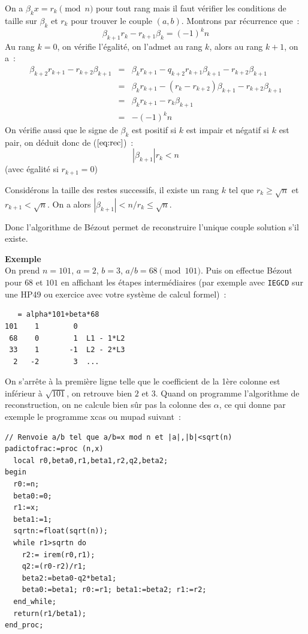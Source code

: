 \documentclass[a4paper,11pt]{book}
\begin{document}
\begin{giacjshere}
On a $ \beta_k x= r_k \pmod n$ pour tout rang mais il faut v\'erifier
les conditions de taille sur $\beta_k$ et $r_k$ pour trouver le couple
$(a,b)$.
Montrons par r\'ecurrence que~:
\begin{equation} \label{eq:rec}
 \beta_{k+1} r_k - r_{k+1} \beta_k = (-1)^k n 
\end{equation}
Au rang $k=0$, on v\'erifie l'\'egalit\'e, on l'admet au rang $k$, 
alors au rang $k+1$, on a~:
\begin{eqnarray*}
 \beta_{k+2} r_{k+1} - r_{k+2} \beta_{k+1} 
& = & \beta_k r_{k+1} - q_{k+2} r_{k+1} \beta_{k+1}  - r_{k+2} \beta_{k+1} \\
& = & \beta_k r_{k+1} - (r_{k}-r_{k+2}) \beta_{k+1}  - r_{k+2} \beta_{k+1} \\
& = & \beta_k r_{k+1} - r_{k} \beta_{k+1} \\
& = & - (-1)^k n
\end{eqnarray*}
On v\'erifie aussi que le signe de $\beta_k$ est positif si $k$ est impair
et n\'egatif si $k$ est pair, on d\'eduit donc de (\(\ref{eq:rec}\))~:
\[ |\beta_{k+1}| r_k < n \]
(avec \'egalit\'e si $r_{k+1}=0$)

Consid\'erons la taille des restes successifs, il existe un rang $k$
tel que $r_k \geq \sqrt{n}$ et $r_{k+1}<\sqrt{n}$. On a alors
$|\beta_{k+1}|  < n/r_k \leq \sqrt{n}$.

Donc l'algorithme de Bézout permet de reconstruire l'unique couple
solution s'il existe.

{\bf Exemple}\\
On prend $n=101$, $a=2$, $b=3$, $a/b=68 \pmod {101}$.
Puis on effectue Bézout pour $68$ et $101$ en affichant les étapes 
intermédiaires (par exemple avec \verb|IEGCD| sur une HP49 ou exercice
avec votre système de calcul formel)~:
\begin{verbatim}
   = alpha*101+beta*68
101    1        0
 68    0        1  L1 - 1*L2
 33    1       -1  L2 - 2*L3
  2   -2        3  ...
\end{verbatim}
On s'arrête à la première ligne telle que le coefficient de la 1ère colonne
est inférieur à $\sqrt{101}$, on retrouve bien $2$ et $3$.
Quand on programme l'algorithme de
reconstruction, on ne calcule bien sûr pas la colonne des $\alpha$,
ce qui donne par exemple le programme xcas ou mupad suivant~:
\begin{verbatim}
// Renvoie a/b tel que a/b=x mod n et |a|,|b|<sqrt(n)
padictofrac:=proc (n,x)
  local r0,beta0,r1,beta1,r2,q2,beta2;
begin
  r0:=n;
  beta0:=0;
  r1:=x;
  beta1:=1;
  sqrtn:=float(sqrt(n));
  while r1>sqrtn do
    r2:= irem(r0,r1); 
    q2:=(r0-r2)/r1;
    beta2:=beta0-q2*beta1;
    beta0:=beta1; r0:=r1; beta1:=beta2; r1:=r2;
  end_while;
  return(r1/beta1);
end_proc;
\end{verbatim}



\end{giacjshere}
\end{document}
